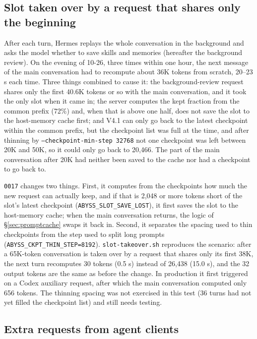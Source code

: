 \documentclass[11pt,a4paper]{article}
\newcommand{\code}[1]{\texttt{#1}}
\begin{document}
\subsection{Slot taken over by a request that shares only the beginning}
\label{sec:takeover}

After each turn, Hermes replays the whole conversation in the background and asks the model whether to save skills and memories (hereafter the background review). On the evening of 10-26, three times within one hour, the next message of the main conversation had to recompute about 36K tokens from scratch, 20--23 s each time. Three things combined to cause it: the background-review request shares only the first 40.6K tokens or so with the main conversation, and it took the only slot when it came in; the server computes the kept fraction from the common prefix (72\%) and, when that is above one half, does not save the slot to the host-memory cache first; and V4.1 can only go back to the latest checkpoint within the common prefix, but the checkpoint list was full at the time, and after thinning by \code{--checkpoint-min-step 32768} not one checkpoint was left between 20K and 50K, so it could only go back to 20,466. The part of the main conversation after 20K had neither been saved to the cache nor had a checkpoint to go back to.

\code{0017} changes two things. First, it computes from the checkpoints how much the new request can actually keep, and if that is 2,048 or more tokens short of the slot's latest checkpoint (\code{ABYSS\_SLOT\_SAVE\_LOST}), it first saves the slot to the host-memory cache; when the main conversation returns, the logic of \S\ref{sec:promptcache} swaps it back in. Second, it separates the spacing used to thin checkpoints from the step used to split long prompts (\code{ABYSS\_CKPT\_THIN\_STEP=8192}). \code{slot-takeover.sh} reproduces the scenario: after a 65K-token conversation is taken over by a request that shares only its first 38K, the next turn recomputes 30 tokens (0.5 s) instead of 26,438 (15.0 s), and the 32 output tokens are the same as before the change. In production it first triggered on a Codex auxiliary request, after which the main conversation computed only 656 tokens. The thinning spacing was not exercised in this test (36 turns had not yet filled the checkpoint list) and still needs testing.

\subsection{Extra requests from agent clients}
\label{sec:hermes}
\end{document}
